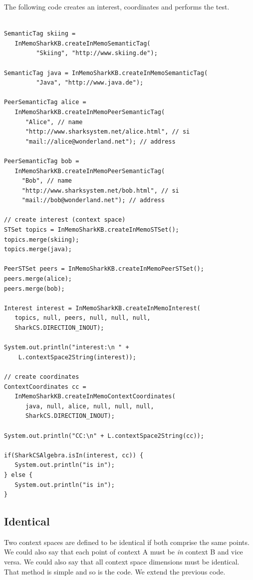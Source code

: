 The following code creates an interest, coordinates and performs the test.

\begin{verbatim}

SemanticTag skiing = 
   InMemoSharkKB.createInMemoSemanticTag(
         "Skiing", "http://www.skiing.de");

SemanticTag java = InMemoSharkKB.createInMemoSemanticTag(
         "Java", "http://www.java.de");

PeerSemanticTag alice = 
   InMemoSharkKB.createInMemoPeerSemanticTag(
      "Alice", // name
      "http://www.sharksystem.net/alice.html", // si
      "mail://alice@wonderland.net"); // address

PeerSemanticTag bob = 
   InMemoSharkKB.createInMemoPeerSemanticTag(
     "Bob", // name
     "http://www.sharksystem.net/bob.html", // si
     "mail://bob@wonderland.net"); // address

// create interest (context space)
STSet topics = InMemoSharkKB.createInMemoSTSet();
topics.merge(skiing);
topics.merge(java);

PeerSTSet peers = InMemoSharkKB.createInMemoPeerSTSet();
peers.merge(alice);
peers.merge(bob);

Interest interest = InMemoSharkKB.createInMemoInterest(
   topics, null, peers, null, null, null, 
   SharkCS.DIRECTION_INOUT);

System.out.println("interest:\n " + 
    L.contextSpace2String(interest));

// create coordinates
ContextCoordinates cc = 
   InMemoSharkKB.createInMemoContextCoordinates(
      java, null, alice, null, null, null, 
      SharkCS.DIRECTION_INOUT);

System.out.println("CC:\n" + L.contextSpace2String(cc));

if(SharkCSAlgebra.isIn(interest, cc)) {
   System.out.println("is in");
} else {
   System.out.println("is in");
}
\end{verbatim}

\subsection{Identical}
Two context spaces are defined to be identical if both comprise the same points. 
We could also say that each point of context A must be {\it in} context B and vice versa. We could also say that all context space dimensions must be identical. That method is simple and so is the code. We extend the previous code.

